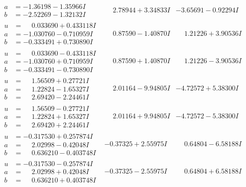 \documentclass[1p]{elsarticle_modified}
\theoremstyle{definition}
\begin{document}
$$\begin{array}{c|c|c}
\begin{aligned}
a &= -1.36198 - 1.35966 I \\
b &= -2.52269 - 1.32132 I\end{aligned}
 & \phantom{-}2.78944 + 3.34833 I & -3.65691 - 0.92294 I \\ \hline\begin{aligned}
u &= \phantom{-}0.033690 + 0.433118 I \\
a &= -1.030760 - 0.710959 I \\
b &= -0.333491 + 0.730890 I\end{aligned}
 & \phantom{-}0.87590 - 1.40870 I & \phantom{-}1.21226 + 3.90536 I \\ \hline\begin{aligned}
u &= \phantom{-}0.033690 - 0.433118 I \\
a &= -1.030760 + 0.710959 I \\
b &= -0.333491 - 0.730890 I\end{aligned}
 & \phantom{-}0.87590 + 1.40870 I & \phantom{-}1.21226 - 3.90536 I \\ \hline\begin{aligned}
u &= \phantom{-}1.56509 + 0.27721 I \\
a &= \phantom{-}1.22824 - 1.65327 I \\
b &= \phantom{-}2.69420 - 2.24461 I\end{aligned}
 & \phantom{-}2.01164 - 9.94805 I & -4.72572 + 5.38300 I \\ \hline\begin{aligned}
u &= \phantom{-}1.56509 - 0.27721 I \\
a &= \phantom{-}1.22824 + 1.65327 I \\
b &= \phantom{-}2.69420 + 2.24461 I\end{aligned}
 & \phantom{-}2.01164 + 9.94805 I & -4.72572 - 5.38300 I \\ \hline\begin{aligned}
u &= -0.317530 + 0.257874 I \\
a &= \phantom{-}2.02998 - 0.42048 I \\
b &= \phantom{-}0.636210 - 0.403748 I\end{aligned}
 & -0.37325 + 2.55975 I & \phantom{-}0.64804 - 6.58188 I \\ \hline\begin{aligned}
u &= -0.317530 - 0.257874 I \\
a &= \phantom{-}2.02998 + 0.42048 I \\
b &= \phantom{-}0.636210 + 0.403748 I\end{aligned}
 & -0.37325 - 2.55975 I & \phantom{-}0.64804 + 6.58188 I \\ \hline\begin{aligned}

\end{aligned}
\end{array}$$
\end{document}
